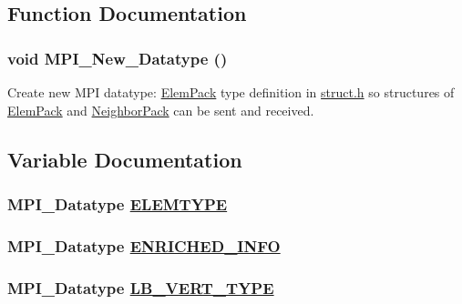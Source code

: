 \subsection{Function Documentation}
\hypertarget{new__datatype_8C_a6}{
\subsubsection[MPI\_\-New\_\-Datatype]{\setlength{\rightskip}{0pt plus 5cm}void MPI\_\-New\_\-Datatype ()}}
\label{new__datatype_8C_a6}


Create new MPI datatype: \hyperlink{structElemPack}{Elem\-Pack} type definition in \hyperlink{struct_8h}{struct.h} so structures of \hyperlink{structElemPack}{Elem\-Pack} and \hyperlink{structNeighborPack}{Neighbor\-Pack} can be sent and received. 



\subsection{Variable Documentation}
\hypertarget{new__datatype_8C_a0}{
\subsubsection[ELEMTYPE]{\setlength{\rightskip}{0pt plus 5cm}MPI\_\-Datatype \hyperlink{new__datatype_8C_a0}{ELEMTYPE}}}
\label{new__datatype_8C_a0}


\hypertarget{new__datatype_8C_a3}{
\subsubsection[ENRICHED\_\-INFO]{\setlength{\rightskip}{0pt plus 5cm}MPI\_\-Datatype \hyperlink{new__datatype_8C_a3}{ENRICHED\_\-INFO}}}
\label{new__datatype_8C_a3}


\hypertarget{new__datatype_8C_a5}{
\subsubsection[LB\_\-VERT\_\-TYPE]{\setlength{\rightskip}{0pt plus 5cm}MPI\_\-Datatype \hyperlink{new__datatype_8C_a5}{LB\_\-VERT\_\-TYPE}}}
\label{new__datatype_8C_a5}


